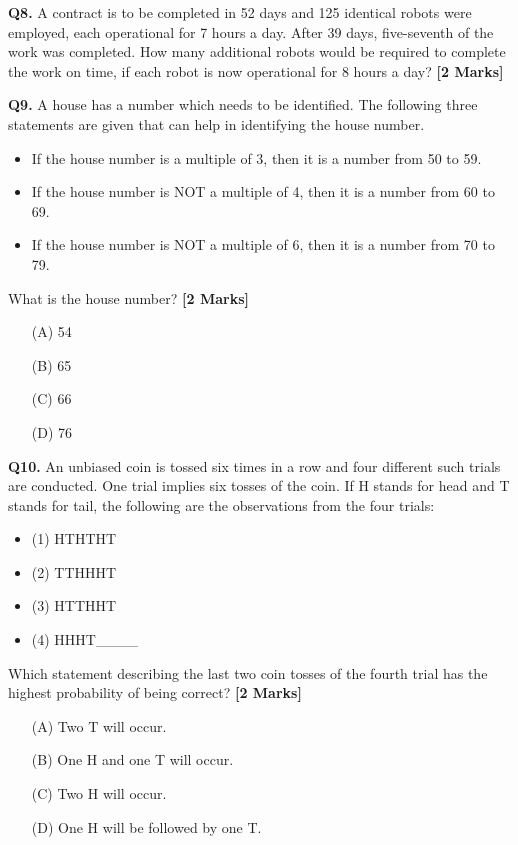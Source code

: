 \documentclass[11pt]{article}
\newcommand{\questionb}[2]{
    \noindent\textbf{Q#2.} #1 \hfill \textbf{[2 Marks]}
}
\begin{document}
\vspace{0.5cm}

\questionb{A contract is to be completed in 52 days and 125 identical robots were employed, each operational for 7 hours a day. After 39 days, five-seventh of the work was completed. How many additional robots would be required to complete the work on time, if each robot is now operational for 8 hours a day?}{8}

\vspace{0.5cm}

\questionb{A house has a number which needs to be identified. The following three statements are given that can help in identifying the house number.

\begin{itemize}
    \item If the house number is a multiple of 3, then it is a number from 50 to 59.
    \item If the house number is NOT a multiple of 4, then it is a number from 60 to 69.
    \item If the house number is NOT a multiple of 6, then it is a number from 70 to 79.
\end{itemize}

What is the house number?}{9}
\begin{enumerate}
    \item[(A)] 54  
    \item[(B)] 65  
    \item[(C)] 66  
    \item[(D)] 76  
\end{enumerate}

\vspace{0.5cm}

\questionb{An unbiased coin is tossed six times in a row and four different such trials are conducted. One trial implies six tosses of the coin. If H stands for head and T stands for tail, the following are the observations from the four trials:

\begin{itemize}
    \item (1) HTHTHT
    \item (2) TTHHHT
    \item (3) HTTHHT
    \item (4) HHHT\_\_\_\_
\end{itemize}

Which statement describing the last two coin tosses of the fourth trial has the highest probability of being correct?}{10}
\begin{enumerate}
    \item[(A)] Two T will occur.  
    \item[(B)] One H and one T will occur.  
    \item[(C)] Two H will occur.  
    \item[(D)] One H will be followed by one T.  
\end{enumerate}
\end{document}
